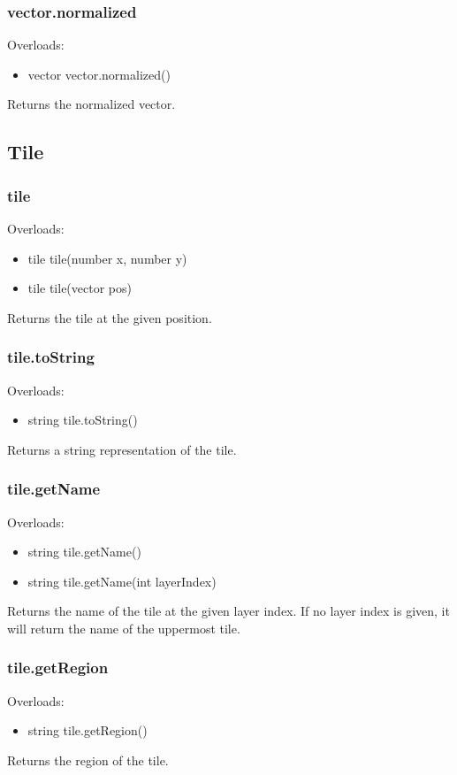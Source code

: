 \documentclass{book}
\newenvironment{ulist}
	{\begin{itemize}
			\itemsep0em}
	{\end{itemize}}
\begin{document}
\subsubsection{vector.normalized}
Overloads:
\begin{ulist}
	\item vector vector.normalized()
\end{ulist}
Returns the normalized vector.

\subsection{Tile}
\subsubsection{tile}
Overloads:
\begin{ulist}
	\item tile tile(number x, number y)
	\item tile tile(vector pos)
\end{ulist}
Returns the tile at the given position.

\subsubsection{tile.toString}
Overloads:
\begin{ulist}
	\item string tile.toString()
\end{ulist}
Returns a string representation of the tile.

\subsubsection{tile.getName}
Overloads:
\begin{ulist}
	\item string tile.getName()
	\item string tile.getName(int layerIndex)
\end{ulist}
Returns the name of the tile at the given layer index. If no layer index is given, it will return the name of the uppermost tile.

\subsubsection{tile.getRegion}
Overloads:
\begin{ulist}
	\item string tile.getRegion()
\end{ulist}
Returns the region of the tile.
\end{document}
